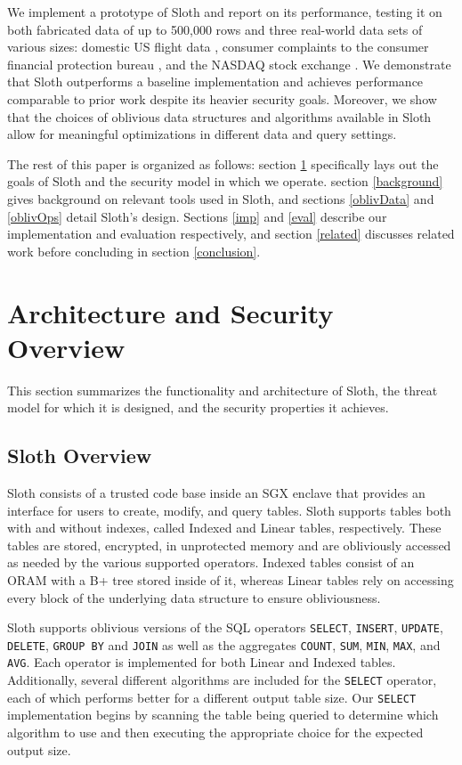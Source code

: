 \documentclass[USenglish,oneside,twocolumn]{article}
\def\name/{Sloth}
\begin{document}
We implement a prototype of Sloth and report on its performance, testing it on both fabricated data of up to 500,000 rows and three real-world data sets of various sizes: domestic US flight data \cite{FLIGHT}, consumer complaints to the consumer financial protection bureau \cite{CFPB}, and the NASDAQ stock exchange \cite{NASDAQ}. We demonstrate that \name/ outperforms a baseline implementation and achieves performance comparable to prior work despite its heavier security goals. Moreover, we show that the choices of oblivious data structures and algorithms available in \name/ allow for meaningful optimizations in different data and query settings. 

The rest of this paper is organized as follows: section \ref{model} specifically lays out the goals of \name/ and the security model in which we operate. section \ref{background} gives background on relevant tools used in \name/, and sections \ref{oblivData} and \ref{oblivOps} detail \name/'s design. Sections \ref{imp} and \ref{eval} describe our implementation and evaluation respectively, and section \ref{related} discusses related work before concluding in section \ref{conclusion}. 

\section{Architecture and Security Overview}\label{model}
This section summarizes the functionality and architecture of Sloth, the threat model for which it is designed, and the security properties it achieves. 

\subsection{\name/ Overview}
\name/ consists of a trusted code base inside an SGX enclave that provides an interface for users to create, modify, and query tables. \name/ supports tables both with and without indexes, called Indexed and Linear tables, respectively. These tables are stored, encrypted, in unprotected memory and are obliviously accessed as needed by the various supported operators. Indexed tables consist of an ORAM with a B+ tree stored inside of it, whereas Linear tables rely on accessing every block of the underlying data structure to ensure obliviousness.

  \name/ supports oblivious versions of the SQL operators \texttt{SELECT}, \texttt{INSERT}, \texttt{UPDATE}, \texttt{DELETE}, \texttt{GROUP BY} and \texttt{JOIN} as well as the aggregates \texttt{COUNT}, \texttt{SUM}, \texttt{MIN}, \texttt{MAX}, and \texttt{AVG}. Each operator is implemented for both Linear and Indexed tables. Additionally, several different algorithms are included for the \texttt{SELECT} operator, each of which performs better for a different output table size. Our \texttt{SELECT} implementation begins by scanning the table being queried to determine which algorithm to use and then executing the appropriate choice for the expected output size. 
  
\end{document}
